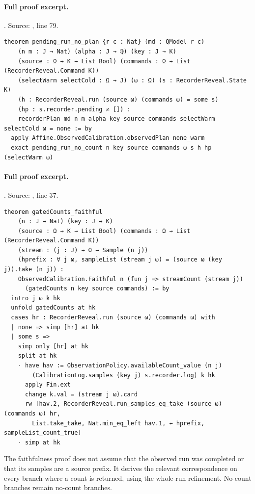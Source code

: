\documentclass[11pt]{article}
\begin{document}
\paragraph{Full proof excerpt.}. Source: , line 79.
\begin{lstlisting}[style=AVOCSource]
theorem pending_run_no_plan {r c : Nat} (md : QModel r c)
    (n m : J → Nat) (alpha : J → ℚ) (key : J → K)
    (source : Ω → K → List Bool) (commands : Ω → List (RecorderReveal.Command K))
    (selectWarm selectCold : Ω → J) (ω : Ω) (s : RecorderReveal.State K)
    (h : RecorderReveal.run (source ω) (commands ω) = some s)
    (hp : s.recorder.pending ≠ []) :
    recorderPlan md n m alpha key source commands selectWarm selectCold ω = none := by
  apply Affine.ObservedCalibration.observedPlan_none_warm
  exact pending_run_no_count n key source commands ω s h hp (selectWarm ω)
\end{lstlisting}

\paragraph{Full proof excerpt.}. Source: , line 37.
\begin{lstlisting}[style=AVOCSource]
theorem gatedCounts_faithful
    (n : J → Nat) (key : J → K)
    (source : Ω → K → List Bool) (commands : Ω → List (RecorderReveal.Command K))
    (stream : (j : J) → Ω → Sample (n j))
    (hprefix : ∀ j ω, sampleList (stream j ω) = (source ω (key j)).take (n j)) :
    ObservedCalibration.Faithful n (fun j => streamCount (stream j))
      (gatedCounts n key source commands) := by
  intro j ω k hk
  unfold gatedCounts at hk
  cases hr : RecorderReveal.run (source ω) (commands ω) with
  | none => simp [hr] at hk
  | some s =>
    simp only [hr] at hk
    split at hk
    · have hav := ObservationPolicy.availableCount_value (n j)
        (CalibrationLog.samples (key j) s.recorder.log) k hk
      apply Fin.ext
      change k.val = (stream j ω).card
      rw [hav.2, RecorderReveal.run_samples_eq_take (source ω) (commands ω) hr,
        List.take_take, Nat.min_eq_left hav.1, ← hprefix, sampleList_count_true]
    · simp at hk
\end{lstlisting}


The faithfulness proof does not assume that the observed run was completed or
that its samples are a source prefix. It derives the relevant correspondence
on every branch where a count is returned, using the whole-run refinement.
No-count branches remain no-count branches.
\end{document}
